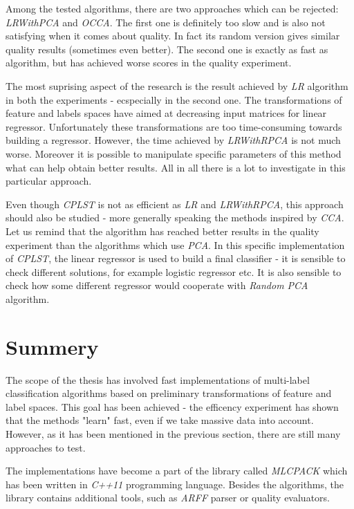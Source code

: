 Among the tested algorithms, there are two approaches which can be rejected: \textit{LRWithPCA} and \textit{OCCA}. The first one is definitely too slow and is also not satisfying when it comes about quality. In fact its random version gives similar quality results (sometimes even better). The second one is exactly as fast as  algorithm, but has achieved worse scores in the quality experiment. 

The most suprising aspect of the research is the result achieved by \textit{LR} algorithm in both the experiments - ecspecially in the second one. The transformations of feature and labels spaces have aimed at decreasing input matrices for linear regressor. Unfortunately these transformations are too time-consuming towards building a regressor. However, the time achieved by \textit{LRWithRPCA} is not much worse. Moreover it is possible to manipulate specific parameters of this method what can help obtain better results. All in all there is a lot to investigate in this particular approach.   

Even though \textit{CPLST} is not as efficient as \textit{LR} and \textit{LRWithRPCA}, this approach should also be studied - more generally speaking the methods inspired by \textit{CCA}. Let us remind that the algorithm has reached better results in the quality experiment than the algorithms which use \textit{PCA}. In this specific implementation of \textit{CPLST}, the linear regressor is used to build a final classifier - it is sensible to check different solutions, for example logistic regressor etc. It is also sensible to check how some different regressor would cooperate with \textit{Random PCA} algorithm.

\section{Summery}

The scope of the thesis has involved fast implementations of multi-label classification algorithms based on preliminary transformations of feature and label spaces. This goal has been achieved - the efficency experiment has shown that the methods "learn" fast, even if we take massive data into account. However, as it has been mentioned in the previous section, there are still many approaches to test.  

The implementations have become a part of the library called \textit{MLCPACK} which has been written in \textit{C++11} programming language. Besides the algorithms, the library contains additional tools, such as \textit{ARFF} parser or quality evaluators. 


